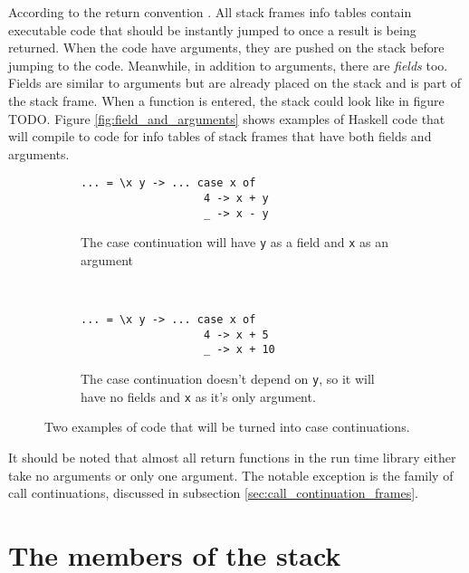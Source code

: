 According to the return convention \cite{commentary_return_convention}.
All stack frames info tables contain executable code that should be
instantly jumped to once a result is being returned. When the code
have arguments, they are pushed on the stack before jumping to the code.
Meanwhile, in addition to arguments, there are \emph{fields} too.
Fields are similar to arguments but are already placed on the stack
and is part of the stack frame. When a function is entered,
the stack could look like in figure TODO. Figure \ref{fig:field_and_arguments} shows examples
of Haskell code that will compile to code for info tables
of stack frames that have both fields and arguments.


\begin{figure}
\begin{mdframed}
        \begin{subfigure}[t]{0.5\textwidth}
          \begin{verbatim}
... = \x y -> ... case x of
                   4 -> x + y
                   _ -> x - y
          \end{verbatim}
          \caption{The case continuation will have \texttt{y} as a field
and \texttt{x} as an argument}
        \end{subfigure}
    ~ %
        \begin{subfigure}[t]{0.5\textwidth}
          \begin{verbatim}
... = \x y -> ... case x of
                   4 -> x + 5
                   _ -> x + 10
          \end{verbatim}
          \caption{The case continuation doesn't depend on \texttt{y},
so it will have no fields and \texttt{x} as it's only argument.}
        \end{subfigure}
  \caption{Two examples of code that will be turned into case
continuations.}
  \label{fig:tricky_arity}
\end{mdframed}
\end{figure}

It should be noted that almost all return functions in the run time library
either take no arguments or only one argument. The notable exception is the
family of call continuations, discussed in subsection \ref{sec:call_continuation_frames}.

\section{The members of the stack}

